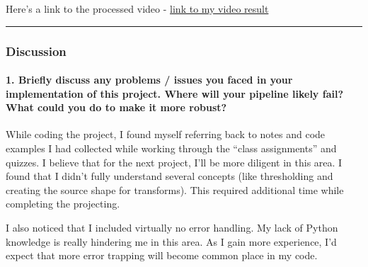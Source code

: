 \documentclass[11pt]{article}
\begin{document}
Here's a link to the processed video - \href{./output1_tracked.mp4}{link
to my video result}

\begin{center}\rule{0.5\linewidth}{\linethickness}\end{center}

\hypertarget{discussion}{%
\subsubsection{Discussion}\label{discussion}}

\hypertarget{briefly-discuss-any-problems-issues-you-faced-in-your-implementation-of-this-project.-where-will-your-pipeline-likely-fail-what-could-you-do-to-make-it-more-robust}{%
\paragraph{1. Briefly discuss any problems / issues you faced in your
implementation of this project. Where will your pipeline likely fail?
What could you do to make it more
robust?}\label{briefly-discuss-any-problems-issues-you-faced-in-your-implementation-of-this-project.-where-will-your-pipeline-likely-fail-what-could-you-do-to-make-it-more-robust}}

While coding the project, I found myself referring back to notes and
code examples I had collected while working through the ``class
assignments'' and quizzes. I believe that for the next project, I'll be
more diligent in this area. I found that I didn't fully understand
several concepts (like thresholding and creating the source shape for
transforms). This required additional time while completing the
projecting.

I also noticed that I included virtually no error handling. My lack of
Python knowledge is really hindering me in this area. As I gain more
experience, I'd expect that more error trapping will become common place
in my code.


    
    
    
    
\end{document}
